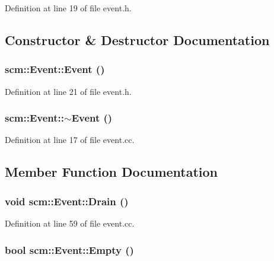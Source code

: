 Definition at line 19 of file event.h.



\subsection{Constructor \& Destructor Documentation}
\hypertarget{classscm_1_1_event_ae0b0fbe856c9fbce52b50e08860946e8}{
\subsubsection[{Event}]{\setlength{\rightskip}{0pt plus 5cm}scm::Event::Event ()}}
\label{classscm_1_1_event_ae0b0fbe856c9fbce52b50e08860946e8}


Definition at line 21 of file event.h.

\hypertarget{classscm_1_1_event_a4f22bf217daf2b5e3670e987579fb152}{
\subsubsection[{$\sim$Event}]{\setlength{\rightskip}{0pt plus 5cm}scm::Event::$\sim$Event ()}}
\label{classscm_1_1_event_a4f22bf217daf2b5e3670e987579fb152}


Definition at line 17 of file event.cc.



\subsection{Member Function Documentation}
\hypertarget{classscm_1_1_event_aba1e9492e1d03bd67afb9c8943e89fe9}{
\subsubsection[{Drain}]{\setlength{\rightskip}{0pt plus 5cm}void scm::Event::Drain ()}}
\label{classscm_1_1_event_aba1e9492e1d03bd67afb9c8943e89fe9}


Definition at line 59 of file event.cc.

\hypertarget{classscm_1_1_event_ae736ee83efd335726cad841b6082e491}{
\subsubsection[{Empty}]{\setlength{\rightskip}{0pt plus 5cm}bool scm::Event::Empty ()}}
\label{classscm_1_1_event_ae736ee83efd335726cad841b6082e491}


